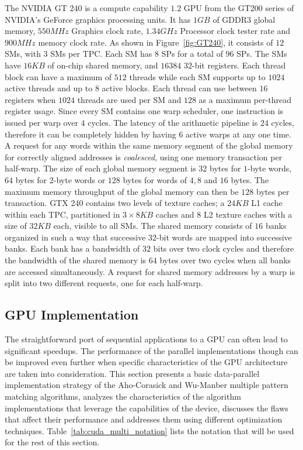 \documentclass{ws-ijait}
\begin{document}
The NVIDIA GT 240 is a compute capability $1.2$ GPU from the GT200 series of NVIDIA's GeForce graphics processing units. It has $1GB$ of GDDR3 global memory, $550MHz$ Graphics clock rate, $1.34GHz$ Processor clock tester rate and $900MHz$ memory clock rate. As shown in Figure~\ref{fig:GT240}, it consists of $12$ SMs, with $3$ SMs per TPC. Each SM has $8$ SPs for a total of $96$ SPs. The SMs have $16KB$ of on-chip shared memory, and $16384$ $32$-bit registers. Each thread block can have a maximum of $512$ threads while each SM supports up to $1024$ active threads and up to $8$ active blocks. Each thread can use between $16$ registers when $1024$ threads are used per SM and $128$ as a maximum per-thread register usage. Since every SM contains one warp scheduler, one instruction is issued per warp over $4$ cycles. The latency of the arithmetic pipeline is $24$ cycles, therefore it can be completely hidden by having $6$ active warps at any one time. A request for any words within the same memory segment of the global memory for correctly aligned addresses is \textit{coalesced}, using one memory transaction per half-warp. The size of each global memory segment is $32$ bytes for $1$-byte words, $64$ bytes for $2$-byte words or $128$ bytes for words of $4, 8$ and $16$ bytes. The maximum memory throughput of the global memory can then be $128$ bytes per transaction. GTX 240 contains two levels of texture caches; a $24KB$ L1 cache within each TPC, partitioned in $3 \times 8KB$ caches and $8$ L2 texture caches with a size of $32KB$ each, visible to all SMs. The shared memory consists of $16$ banks organized in such a way that successive $32$-bit words are mapped into successive banks.\cite{CUDA_SDK} Each bank has a bandwidth of $32$ bits over two clock cycles and therefore the bandwidth of the shared memory is $64$ bytes over two cycles when all banks are accessed simultaneously. A request for shared memory addresses by a warp is split into two different requests, one for each half-warp.

\subsection{GPU Implementation}
\label{sec:GPU-Implementation}

The straightforward port of sequential applications to a GPU can often lead to significant speedups. The performance of the parallel implementations though can be improved even further when specific characteristics of the GPU architecture are taken into consideration. This section presents a basic data-parallel implementation strategy of the Aho-Corasick and Wu-Manber multiple pattern matching algorithms, analyzes the characteristics of the algorithm implementations that leverage the capabilities of the device, discusses the flaws that affect their performance and addresses them using different optimization techniques.
Table~\ref{tab:cuda_multi_notation} lists the notation that will be used for the rest of this section.
\end{document}
